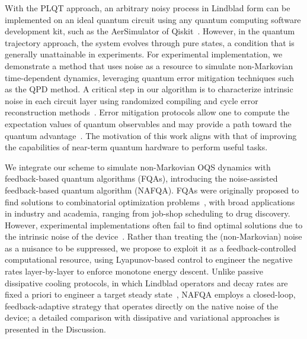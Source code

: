 \documentclass[10pt, superscriptaddress,aps,pra,twocolumn,showpacs,nofootinbib, longbibliography, notitlepage,floatfix]{revtex4-2}
\begin{document}
With the PLQT approach, an arbitrary noisy process in Lindblad form can be implemented on an ideal quantum circuit using any quantum computing software development kit, such as the AerSimulator of Qiskit~\cite{Qiskit2021}. However, in the quantum trajectory approach, the system evolves through pure states, a condition that is generally unattainable in experiments. For experimental implementation, we demonstrate a method that uses noise as a resource to simulate non-Markovian time-dependent dynamics, leveraging quantum error mitigation techniques such as the QPD method. A critical step in our algorithm is to characterize intrinsic noise in each circuit layer using randomized compiling and cycle error reconstruction methods~\cite{EmersonPRA2016, Flammia2020, EmersonPRX2021}. Error mitigation protocols allow one to compute the expectation values of quantum observables and may provide a path toward the quantum advantage~\cite{Blatt_nat_comm_2019, vandenBerg2023_natphys, Kim2023, aharonov2025importanceerrormitigationquantum, zimborás2025mythsquantumcomputationfault}. The motivation of this work aligns with that of improving the capabilities of near-term quantum hardware to perform useful tasks. 

We integrate our scheme to simulate non-Markovian OQS dynamics with feedback-based quantum algorithms (FQAs), introducing the noise-assisted feedback-based quantum algorithm (NAFQA). FQAs were originally proposed to find solutions to combinatorial optimization problems~\cite{SarovarPRL2022, Magann_PRA_2022}, with broad applications in industry and academia, ranging from job-shop scheduling to drug discovery. However, experimental implementations often fail to find optimal solutions due to the intrinsic noise of the device~\cite{SarovarPRL2022, RKMalla_PRR_2024}. {Rather than treating the (non-Markovian) noise as a nuisance to be suppressed, we propose to exploit it as a feedback-controlled computational resource, using Lyapunov-based control to engineer the negative rates layer-by-layer to enforce monotone energy descent. Unlike passive dissipative cooling protocols, in which Lindblad operators and decay rates are fixed a priori to engineer a target steady state~\cite{Verstraete2009, kraus_pra_2008, science_dissipation}, NAFQA employs a closed-loop, feedback-adaptive strategy that operates directly on the native noise of the device; a detailed comparison with dissipative and variational approaches is presented in the Discussion.} 
\end{document}
